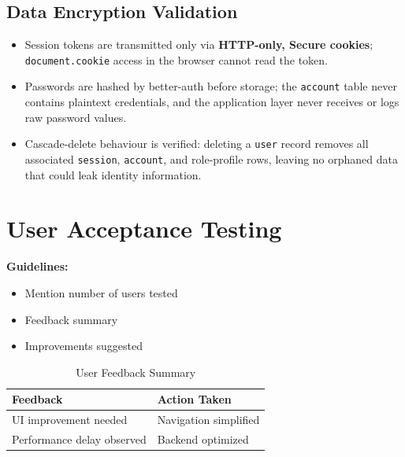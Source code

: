 \subsection{Data Encryption Validation}

\begin{itemize}
    \item Session tokens are transmitted only via \textbf{HTTP-only, Secure cookies};
          \texttt{document.cookie} access in the browser cannot read the token.
    \item Passwords are hashed by better-auth before storage; the \texttt{account} table
          never contains plaintext credentials, and the application layer never receives or
          logs raw password values.
    \item Cascade-delete behaviour is verified: deleting a \texttt{user} record removes
          all associated \texttt{session}, \texttt{account}, and role-profile rows,
          leaving no orphaned data that could leak identity information.
\end{itemize}


\section{User Acceptance Testing}

\textbf{Guidelines:}
\begin{itemize}
    \item Mention number of users tested
    \item Feedback summary
    \item Improvements suggested
\end{itemize}

\begin{table}[h]
\centering
\caption{User Feedback Summary}
\begin{tabularx}{\textwidth}{|X|X|}
\hline
\textbf{Feedback} & \textbf{Action Taken} \\
\hline
UI improvement needed & Navigation simplified \\
\hline
Performance delay observed & Backend optimized \\
\hline
\end{tabularx}
\end{table}

